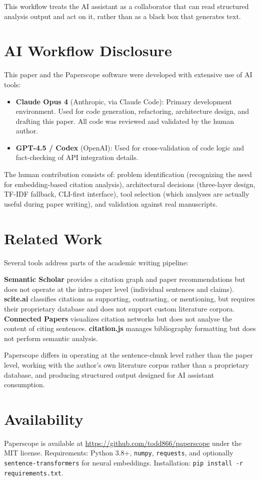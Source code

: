 \documentclass[11pt,a4paper]{article}
\begin{document}
This workflow treats the AI assistant as a collaborator that can read structured analysis output and act on it, rather than as a black box that generates text.

\section{AI Workflow Disclosure}

This paper and the Paperscope software were developed with extensive use of AI tools:

\begin{itemize}
    \item \textbf{Claude Opus 4} (Anthropic, via Claude Code): Primary development environment. Used for code generation, refactoring, architecture design, and drafting this paper. All code was reviewed and validated by the human author.
    \item \textbf{GPT-4.5 / Codex} (OpenAI): Used for cross-validation of code logic and fact-checking of API integration details.
\end{itemize}

The human contribution consists of: problem identification (recognizing the need for embedding-based citation analysis), architectural decisions (three-layer design, TF-IDF fallback, CLI-first interface), tool selection (which analyses are actually useful during paper writing), and validation against real manuscripts.

\section{Related Work}

Several tools address parts of the academic writing pipeline:

\textbf{Semantic Scholar} \citep{kinney2023semantic} provides a citation graph and paper recommendations but does not operate at the intra-paper level (individual sentences and claims). \textbf{scite.ai} classifies citations as supporting, contrasting, or mentioning, but requires their proprietary database and does not support custom literature corpora. \textbf{Connected Papers} visualizes citation networks but does not analyse the content of citing sentences. \textbf{citation.js} \citep{willighagen2019citationjs} manages bibliography formatting but does not perform semantic analysis.

Paperscope differs in operating at the sentence-chunk level rather than the paper level, working with the author's own literature corpus rather than a proprietary database, and producing structured output designed for AI assistant consumption.

\section{Availability}

Paperscope is available at \url{https://github.com/todd866/paperscope} under the MIT license. Requirements: Python 3.8+, \texttt{numpy}, \texttt{requests}, and optionally \texttt{sentence-transformers} for neural embeddings. Installation: \texttt{pip install -r requirements.txt}.


\end{document}

